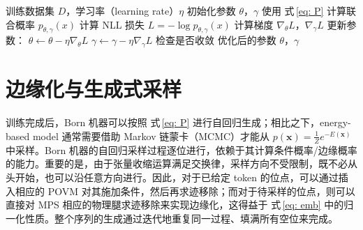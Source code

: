 \documentclass[aps,prb,twocolumn,superscriptaddress]{revtex4-2}
\newcommand{\vect}[1]{{\bm{#1}}}
\newcommand{\eqnref}[1]{式\,\eqref{#1}}
\begin{document}
\begin{algorithm}[H]
\caption{Born 机器的训练过程}
\label{alg:train}
\begin{algorithmic}
\REQUIRE 训练数据集 $D$，学习率（learning rate）$\eta$
\STATE 初始化参数 $\theta$，$\gamma$
        \STATE 使用 \eqnref{eq: P} 计算联合概率 $p_{\theta,\gamma}(x)$
        \STATE 计算 NLL 损失 $L = -\log p_{\theta,\gamma}(x)$
        \STATE 计算梯度 $\nabla_{\theta} L$，$\nabla_{\gamma} L$
        \STATE 更新参数：
        \STATE $\theta \leftarrow \theta - \eta \nabla_{\theta} L$
        \STATE $\gamma \leftarrow \gamma - \eta \nabla_{\gamma} L$
    \ENDFOR
    \STATE 检查是否收敛
\ENDWHILE
\ENSURE 优化后的参数 $\theta$，$\gamma$
\end{algorithmic}
\end{algorithm}
\section{边缘化与生成式采样}

训练完成后，Born 机器可以按照 \eqnref{eq: P} 进行自回归生成；相比之下，energy-based model 通常需要借助 Markov 链蒙卡（MCMC）才能从 $p(\vect{x})=\frac{1}{Z}e^{-E(\vect{x})}$ 中采样。Born 机器的自回归采样过程逐位进行，依赖于其计算条件概率/边缘概率的能力。重要的是，由于张量收缩运算满足交换律，采样方向不受限制，既不必从头开始，也可以沿任意方向进行。因此，对于已给定 token 的位点，可以通过插入相应的 POVM 对其施加条件，然后再求迹移除；而对于待采样的位点，则可以直接对 MPS 相应的物理腿求迹移除来实现边缘化，这得益于 \eqnref{eq: emb} 中的归一化性质。整个序列的生成通过迭代地重复同一过程、填满所有空位来完成。
\end{document}
